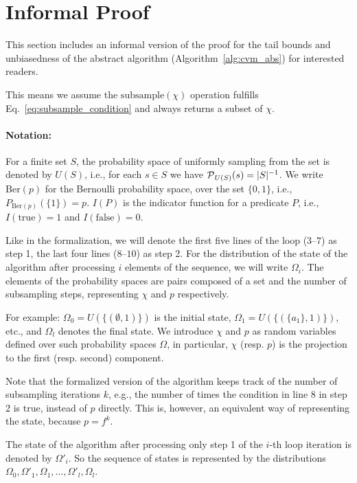 \section{Informal Proof\label{apx:informal_proof}}
This section includes an informal version of the proof for the tail bounds and unbiasedness
of the abstract algorithm (Algorithm~\ref{alg:cvm_abs}) for interested readers.

This means we assume the $\mathrm{subsample}(\chi)$ operation fulfills
Eq.~\ref{eq:subsample_condition} and always returns a subset of $\chi$.

\paragraph{Notation:} For a finite set $S$, the probability space of uniformly sampling from the set
is denoted by $U(S)$, i.e., for each $s \in S$ we have $\operatorname{\mathcal P}_{U(S)}({s}) = |S|^{-1}$.
We write $\mathrm{Ber}(p)$ for the Bernoulli probability space, over the set $\{0,1\}$, i.e.,
$P_{\mathrm{Ber}(p)}(\{1\}) = p$. $I(P)$ is the indicator function for a predicate $P$, i.e.,
$I(\mathrm{true}) = 1$ and $I(\mathrm{false}) = 0$.

Like in the formalization, we will denote the first five lines of the loop ($3$--$7$) as step 1, 
the last four lines ($8$--$10$) as step 2. For the distribution of the state of the algorithm after
processing $i$ elements of the sequence, we will write $\Omega_i$.
The elements of the probability spaces are pairs composed of a set and the number of subsampling
steps, representing $\chi$ and $p$ respectively.

For example: $\Omega_0 = U(\{(\emptyset, 1)\})$ is the initial state, 
$\Omega_1 = U(\{(\{a_1\}, 1)\})$, etc., and $\Omega_l$ denotes the final state.
We introduce $\chi$ and $p$ as random variables defined over such probability spaces $\Omega$, 
in particular, $\chi$ (resp. $p$) is the projection to the first (resp. second) component.

Note that the formalized version of the algorithm keeps track of the number of
subsampling iterations $k$, e.g., the number of times the condition in line 8 in step 2 is true,
instead of $p$ directly. This is, however, an equivalent way of representing the state, because 
$p = f^k$.

The state of the algorithm after processing only step 1 of the $i$-th loop iteration is denoted by 
$\Omega'_i$. So the sequence of states is represented by the distributions 
$\Omega_0, \Omega'_1, \Omega_1, \ldots, \Omega'_l, \Omega_l$.

